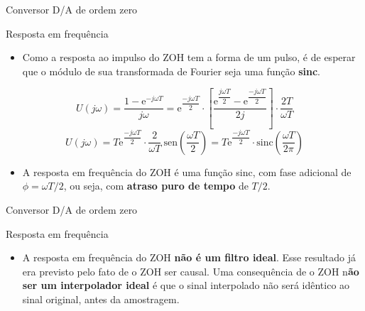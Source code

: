 \begin{frame}{Conversor D/A de ordem zero}
\begin{block}{Resposta em frequência}
\begin{itemize}
    \item Como a resposta ao impulso do ZOH tem a forma de um pulso, é de esperar que o módulo de sua transformada de Fourier seja uma função \textbf{sinc}.
\end{itemize}

\begin{equation*}
U(j\omega) = \dfrac{1 - \text{e}^{-j\omega T}}{j\omega} = \text{e}^{\dfrac{-j\omega T}{2}} \cdot \left[\dfrac{\text{e}^{\dfrac{j\omega T}{2}} - \text{e}^{\dfrac{-j\omega T}{2}}}{2j}\right] \cdot \dfrac{2T}{\omega T}
\end{equation*}
\begin{equation*}
U(j\omega) = T \text{e}^{\dfrac{-j\omega T}{2}} \cdot \dfrac{2}{\omega T} \ \text{sen} \left(\dfrac{\omega T}{2}\right) = T \text{e}^{\dfrac{-j\omega T}{2}} \cdot \text{sinc} \left(\dfrac{\omega T}{2\pi}\right)
\end{equation*}
\begin{itemize}
    \item A resposta em  frequência do ZOH é uma função sinc, com  fase adicional de $\phi = \omega T/2$, ou seja, com  \textbf{atraso puro de tempo} de $T/2$.
\end{itemize}
\end{block}
\end{frame}

\begin{frame}{Conversor D/A de ordem zero}
\begin{block}{Resposta em frequência}
\begin{itemize}
    \item A resposta em frequência do ZOH\textbf{ não é um filtro ideal}. Esse resultado já era previsto pelo fato de o ZOH ser causal. Uma consequência de  o ZOH n\textbf{ão ser um interpolador ideal} é que o sinal interpolado não será idêntico ao sinal  original, antes da amostragem.
\end{itemize}
\end{block}
\end{frame}

